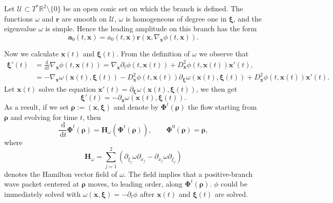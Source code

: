\documentclass[11pt,reqno]{amsart}
\newcommand{\dd}{\,\mathrm{d}}
\numberwithin{equation}{section}
\begin{document}
Let $\mathcal U\subset T^*\mathbb R^2\setminus\{0\}$ be an open conic set on which the branch is defined. The functions $\omega$ and $\bm r$ are smooth on $\mathcal U$, $\omega$ is homogeneous of degree one in $\bm\xi$, and the eigenvalue $\omega$ is simple. Hence the leading amplitude on this branch has the form
\begin{equation*}
    \bm a_0(t,\bm x)=a_0(t,\bm x)\bm r(\bm x,\nabla_{\bm x}\phi(t,\bm x)).
\end{equation*}

Now we calculate $\bm{x}(t)$ and $\bm{\xi}(t)$. From the definition of $\omega$ we observe that
\begin{align*}
    \bm{\xi}'(t) &= \frac{\mathrm{d}}{\mathrm{d}t}\nabla_{\bm{x}}\phi(t,\bm{x}(t)) = \nabla_{\bm{x}}\partial_t\phi(t,\bm{x}(t)) + D_{\bm{x}}^2\phi(t,\bm{x}(t))\bm{x}'(t), \\
    &= -\nabla_{\bm{x}}\omega(\bm{x}(t),\bm{\xi}(t)) - D_{\bm{x}}^2\phi(t,\bm{x}(t))\partial_{\bm{\xi}}\omega(\bm{x}(t),\bm{\xi}(t))+D_{\bm{x}}^2\phi(t,\bm{x}(t))\bm{x}'(t).
\end{align*}
Let $\bm{x}(t)$ solve the equation $\bm{x}'(t)=\partial_{\bm{\xi}}\omega(\bm{x}(t),\bm{\xi}(t))$, we then get 
$$
\bm{\xi}'(t)=-\partial_{\bm{x}}\omega(\bm{x}(t),\bm{\xi}(t)).
$$
As a result, if we set $\bm\rho:=(\bm x,\bm\xi)$ and denote by $\bm\Phi^t(\bm\rho)$ the flow starting from $\bm\rho$ and evolving for time $t$, then
\begin{equation*}
    \frac{\dd}{\dd t}\bm{\Phi}^t(\bm{\rho})=\bm H_\omega(\bm{\Phi}^t(\bm{\rho})), \qquad \bm{\Phi}^0(\bm{\rho})=\bm{\rho}, 
\end{equation*}
where 
\begin{equation*}
    \bm H_\omega = \sum_{j=1}^2\left(\partial_{\xi_j}\omega\partial_{x_j}   -\partial_{x_j}\omega\partial_{\xi_j}\right)
\end{equation*}
denotes the Hamilton vector field of $\omega$. The field implies that a positive-branch wave packet centered at $\bm\rho$ moves, to leading order, along $\bm\Phi^t(\bm\rho)$. $\phi$ could be immediately solved with $\omega(\bm{x},\bm{\xi})=-\partial_t\phi$ after $\bm{x}(t)$ and $\bm{\xi}(t)$ are solved. 
\end{document}
